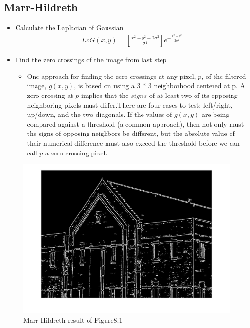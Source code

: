 \documentclass[11pt,oneside]{book}
\begin{document}
\subsection{Marr-Hildreth}
\begin{itemize}
\item Calculate the Laplacian of Gaussian
\begin{align}
  LoG(x,y) = [\frac{x^2+y^2-2\sigma ^2}{\sigma ^4}]e^{-\frac{x^2+y^2}{2\sigma ^2}}
\end{align}
\item Find the zero crossings of the image from last step
  \begin{itemize}
    \item One approach for finding the zero crossings at any pixel, $p$, of the filtered image, $g(x, y)$, is based on using a 3 * 3 neighborhood centered at p. A zero crossing at $p$ implies that the $signs$ of at least two of its opposing neighboring pixels must differ.There are four cases to test: left/right, up/down, and the two diagonals. If the values of $g(x, y)$ are being compared against a threshold (a common approach), then not only must the signs of opposing neighbors be different, but the absolute value of their numerical difference must also exceed the threshold before we can call $p$ a zero-crossing pixel.
  \end{itemize}
\end{itemize}
\newpage
\begin{figure}[!htb]
   \centering  
   \includegraphics[width=1\textwidth]{images/9/marr.jpg}
   \caption{Marr-Hildreth result of Figure8.1}
\end{figure}
\end{document}
